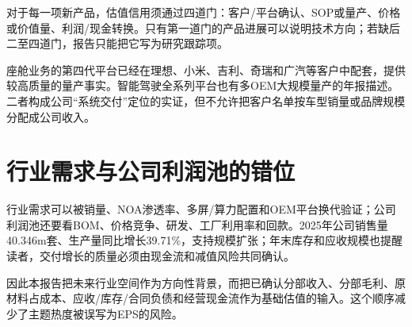 \begin{keyinsight}[技术论点的财务门槛]
对于每一项新产品，估值信用须通过四道门：客户/平台确认、SOP或量产、价格或价值量、利润/现金转换。只有第一道门的产品进展可以说明技术方向；若缺后二至四道门，报告只能把它写为研究跟踪项。
\end{keyinsight}

座舱业务的第四代平台已经在理想、小米、吉利、奇瑞和广汽等客户中配套，提供较高质量的量产事实。智能驾驶全系列平台也有多OEM大规模量产的年报描述。二者构成公司“系统交付”定位的实证，但不允许把客户名单按车型销量或品牌规模分配成公司收入。

\section{行业需求与公司利润池的错位}

行业需求可以被销量、NOA渗透率、多屏/算力配置和OEM平台换代验证；公司利润池还要看BOM、价格竞争、研发、工厂利用率和回款。2025年公司销售量40.346m套、生产量同比增长39.71\%，支持规模扩张；年末库存和应收规模也提醒读者，交付增长的质量必须由现金流和减值风险共同确认。

因此本报告把未来行业空间作为方向性背景，而把已确认分部收入、分部毛利、原材料占成本、应收/库存/合同负债和经营现金流作为基础估值的输入。这个顺序减少了主题热度被误写为EPS的风险。
